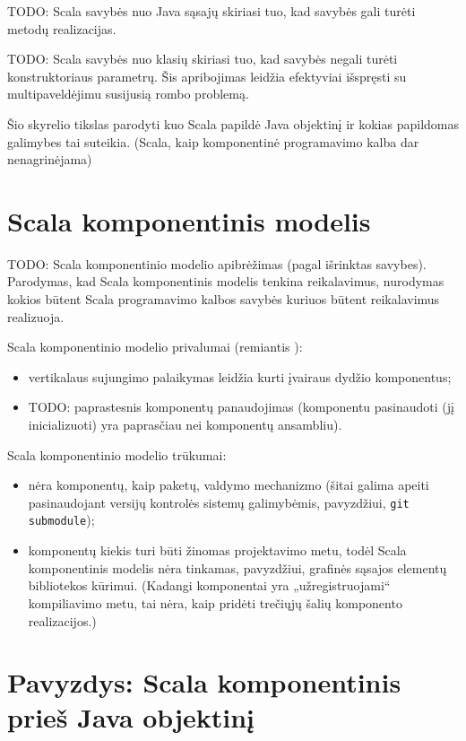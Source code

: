 TODO: Scala savybės nuo Java sąsajų skiriasi tuo, kad savybės gali turėti
metodų realizacijas.

TODO: Scala savybės nuo klasių skiriasi tuo, kad savybės negali turėti
konstruktoriaus parametrų. Šis apribojimas leidžia efektyviai
išspręsti su multipaveldėjimu susijusią rombo problemą.

Šio skyrelio tikslas parodyti kuo Scala papildė Java objektinį ir
kokias papildomas galimybes tai suteikia. (Scala, kaip komponentinė
programavimo kalba dar nenagrinėjama)

\section{Scala komponentinis modelis}

TODO: Scala komponentinio modelio apibrėžimas (pagal išrinktas savybes).
Parodymas, kad Scala komponentinis modelis tenkina reikalavimus,
nurodymas kokios būtent Scala programavimo kalbos savybės kuriuos
būtent reikalavimus realizuoja.

Scala komponentinio modelio privalumai (remiantis
\cite{classification-framework-for-scm}):
\begin{itemize}
  \item vertikalaus sujungimo\cite[599]{classification-framework-for-scm}
    palaikymas leidžia kurti įvairaus dydžio  komponentus;
  \item TODO: paprastesnis komponentų panaudojimas (komponentu
    pasinaudoti (jį inicializuoti) yra paprasčiau nei komponentų
    ansambliu).
\end{itemize}

Scala komponentinio modelio trūkumai:
\begin{itemize}
  \item nėra komponentų, kaip paketų, valdymo mechanizmo (šitai galima
    apeiti pasinaudojant versijų kontrolės sistemų galimybėmis,
    pavyzdžiui, \verb|git submodule|);
  \item komponentų kiekis turi būti žinomas projektavimo metu, todėl
    Scala komponentinis modelis nėra tinkamas, pavyzdžiui,
    grafinės sąsajos elementų bibliotekos 
    kūrimui. (Kadangi komponentai yra „užregistruojami“
    kompiliavimo metu, tai nėra, kaip pridėti trečiųjų šalių
    komponento realizacijos.)
\end{itemize}

\section{Pavyzdys: Scala komponentinis prieš Java objektinį}


